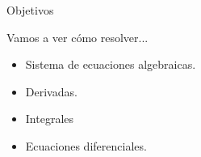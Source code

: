 \begin{frame}[t]{Objetivos}\vspace{10pt}

Vamos a ver cómo resolver...

\begin{itemize}
	\item Sistema de ecuaciones algebraicas.
	\item Derivadas.
	\item Integrales
	\item Ecuaciones diferenciales.
\end{itemize}

\end{frame}